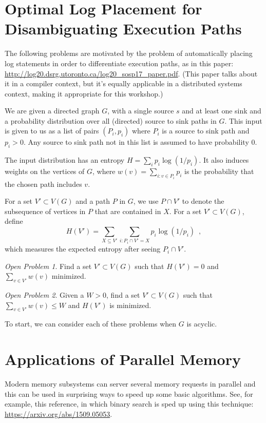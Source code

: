 \documentclass{article}
\theoremstyle{remark}
\newtheorem{op}{Open Problem}
\begin{document}
\section{Optimal Log Placement for Disambiguating Execution Paths}

The following problems are motivated by the problem of automatically
placing log statements in order to differentiate execution paths, as in
this paper:  
\url{http://log20.dsrg.utoronto.ca/log20_sosp17_paper.pdf}.
(This paper talks about it in a compiler context, but it's equally applicable in a distributed systems context, making it appropriate for this workshop.)

We are given a directed graph $G$, with a single source $s$ and at least one sink and a probability distribution over all (directed) source to sink paths in $G$. This input is given to us as a list of pairs $(P_i,p_i)$ where $P_i$ is a source to sink path and $p_i>0$. Any source to sink path not in this list is assumed to have probability 0.

The input distribution has an entropy $H=\sum_{i}p_i\log(1/p_i)$.  It also induces weights on the vertices of $G$, where $w(v)=\sum_{i:v\in P_i} p_i$ is the probability that the chosen path includes $v$.  

For a set $V'\subset V(G)$ and a path $P$ in $G$, we use $P\cap V'$ to denote the subsequence of vertices in $P$ that are contained in $X$.  For a set $V'\subset V(G)$, define
\[
   H(V') = \sum_{X\subseteq V'}\sum_{i:P_i\cap V'=X} p_i\log(1/p_i) \enspace ,
\]
which measures the expected entropy after seeing $P_i\cap V'$.

\begin{op}
  Find a set $V'\subset V(G)$ such that $H(V')=0$ and $\sum_{v\in V'} w(v)$ minimized.
\end{op}

\begin{op}
  Given a $W>0$, find a set $V'\subset V(G)$ such that $\sum_{v\in V'} w(v)\le W$ and $H(V')$ is minimized.
\end{op}

To start, we can consider each of these problems when $G$ is acyclic.

\section{Applications of Parallel Memory}

Modern memory subsystems can server several memory requests in parallel and this can be used in surprising ways to speed up some basic algorithms.  See, for example, this reference, in which binary search is sped up using this technique: \url{https://arxiv.org/abs/1509.05053}.
\end{document}
